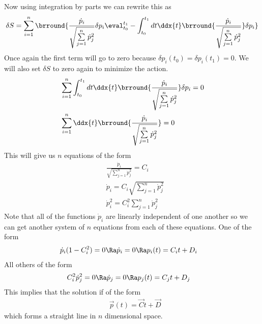 Now using integration by parts we can rewrite this as
\begin{align*}
    &\delta S=\sum_{i=1}^n\brround{\frac{\dot{p}_i}{\sqrt{\sum\limits_{j=1}^n \dot{p}_j^2}}\delta p_i\eval_{t_0}^{t_1}-\int_{t_0}^{t_1}dt\ddx{t}\brround{\frac{\dot{p}_i}{\sqrt{\sum\limits_{j=1}^n \dot{p}_j^2}}}\delta p_i}\\
\end{align*}
Once again the first term will go to zero because $\delta p_i(t_0)=\delta p_i(t_1)=0$. We will also set $\delta S$ to zero again to minimize the action.
\begin{align*}
    &\sum_{i=1}^n\int_{t_0}^{t_1}dt\ddx{t}\brround{\frac{\dot{p}_i}{\sqrt{\sum\limits_{j=1}^n \dot{p}_j^2}}}\delta p_i=0\\
    &\sum_{i=1}^n\ddx{t}\brround{\frac{\dot{p}_i}{\sqrt{\sum\limits_{j=1}^n \dot{p}_j^2}}}=0
\end{align*}
This will give us $n$ equations of the form
\begin{align*}
    &\frac{\dot{p}_i}{\sqrt{\sum\limits_{j=1}^n \dot{p}_j^2}}=C_i\\
    &\dot{p}_i=C_i\sqrt{\sum\limits_{j=1}^n \dot{p}_j^2}\\
    &\dot{p}_i^2=C_i^2\sum\limits_{j=1}^n \dot{p}_j^2
\end{align*}
Note that all of the functions $\dot{p}_i$ are linearly independent of one another so we can get another system of $n$ equations from each of these equations. One of the form
\begin{align*}
    &\dot{p}_i(1-C_i^2)=0\Ra \dot{p}_i=0\Ra p_i(t)=C_it+D_i
\end{align*}
All others of the form
\begin{align*}
    &C_i^2\dot{p}_j^2=0\Ra \dot{p}_j=0\Ra p_j(t)=C_jt+D_j
\end{align*}
This implies that the solution if of the form
\begin{align*}
    &\vec{p}(t)=\vec{C}t+\vec{D}
\end{align*}
which forms a straight line in $n$ dimensional space.\\

